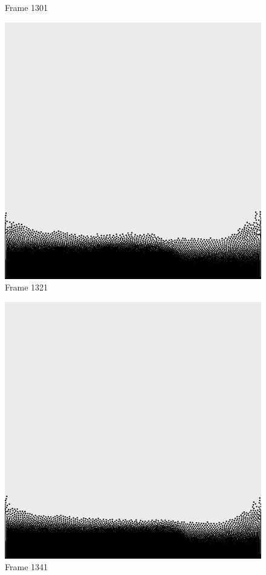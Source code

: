 \documentclass[a4paper, 12pt, oneside]{book}
\begin{document}
\begin{figure}[!ht]
\begin{center}
            Frame 1301
        \end{center}
    \endminipage
    \hfill
        \begin{center}
            \includegraphics[width=\linewidth]{images/test_case_2/1321.png}
            Frame 1321
        \end{center}
    \endminipage
    \hfill
        \begin{center}
            \includegraphics[width=\linewidth]{images/test_case_2/1341.png}
            Frame 1341
        \end{center}
    \endminipage
    \hfill


\end{figure}
\end{document}
